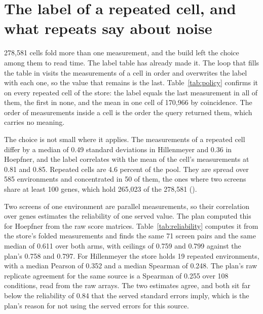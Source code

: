 
\section{The label of a repeated cell, and what repeats say about noise}
\label{sec:label}

278{,}581 cells fold more than one measurement, and the build left the choice among them
to read time. The label table has already made it. The loop that fills the table in
 visits the measurements of a cell in order and
overwrites the label with each one, so the value that remains is the last. Table~\ref{tab:policy}
confirms it on every repeated cell of the store: the label equals the last measurement in
all of them, the first in none, and the mean in one cell of 170{,}966 by coincidence. The
order of measurements inside a cell is the order the query returned them, which carries no
meaning.

\begin{table}[htbp]
\centering
\footnotesize
\caption{Which measurement the label table holds for a repeated cell. The three label
columns are the share of repeated cells whose label equals that measurement. Range over
sd is the median spread between a cell's measurements in units of the source's standard
deviation. The last column is the Pearson correlation between the label and the mean of
the cell's measurements.}
\label{tab:policy}

\end{table}

The choice is not small where it applies. The measurements of a repeated cell differ by a
median of 0.49 standard deviations in Hillenmeyer and 0.36 in Hoepfner, and the label
correlates with the mean of the cell's measurements at 0.81 and 0.85. Repeated cells are
4.6 percent of the pool. They are spread over 585 environments and concentrated in 50 of
them, the ones where two screens share at least 100 genes, which hold 265{,}023 of the
278{,}581 ().

Two screens of one environment are parallel measurements, so their correlation over genes
estimates the reliability of one served value. The plan computed this for Hoepfner from
the raw score matrices. Table~\ref{tab:reliability} computes it from the store's folded
measurements and finds the same 71 screen pairs and the same median of 0.611 over both
arms, with ceilings of 0.759 and 0.799 against the plan's 0.758 and 0.797. For Hillenmeyer
the store holds 19 repeated environments, with a median Pearson of 0.352 and a median
Spearman of 0.248. The plan's raw replicate agreement for the same source is a Spearman of
0.255 over 108 conditions, read from the raw arrays. The two estimates agree, and both sit
far below the reliability of 0.84 that the served standard errors imply, which is the
plan's reason for not using the served errors for this source.

